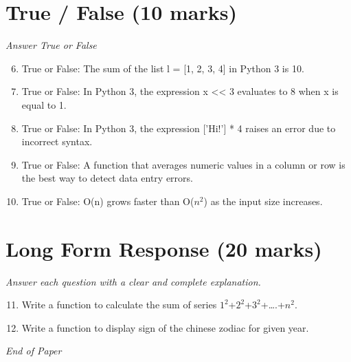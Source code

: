 \documentclass[12pt]{article}
\begin{document}
\section*{True / False (10 marks)}
\textit{Answer True or False}
\begin{enumerate}[label=\arabic*.]
\setcounter{enumi}{5}
\item True or False: The sum of the list l = [1, 2, 3, 4] in Python 3 is 10.
\item True or False: In Python 3, the expression x \textless{}\textless{} 3 evaluates to 8 when x is equal to 1.
\item True or False: In Python 3, the expression ['Hi!'] * 4 raises an error due to incorrect syntax.
\item True or False: A function that averages numeric values in a column or row is the best way to detect data entry errors.
\item True or False: O(n) grows faster than O($n^2$) as the input size increases.
\end{enumerate}

\section*{Long Form Response (20 marks)}
\textit{Answer each question with a clear and complete explanation.}
\begin{enumerate}[label=\arabic*.]
\setcounter{enumi}{10}
\item Write a function to calculate the sum of series $1^2$+$2^2$+$3^2$+….+$n^2$.
\item Write a function to display sign of the chinese zodiac for given year.
\end{enumerate}

\vfill
\noindent\textit{End of Paper}
\end{document}
